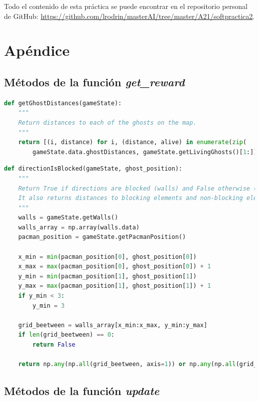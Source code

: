 \documentclass[11pt]{exam}
\begin{document}
Todo el contenido de esta práctica se puede encontrar en el repositorio personal de GitHub: \url{https://github.com/lrodrin/masterAI/tree/master/A21/softpractica2}.

\section{Apéndice}\label{apendice}

\subsection{Métodos de la función \textit{get\_reward}}\label{apendice_reward}

\begin{lstlisting}[caption={Función getGhostDistances.}, label={getGhostDistances}, language=python, basicstyle=\footnotesize]
def getGhostDistances(gameState):
	"""
	Return distances to each of the ghosts on the map.
	"""
	return [(i, distance) for i, (distance, alive) in enumerate(zip(
		gameState.data.ghostDistances, gameState.getLivingGhosts()[1:])) if alive]
\end{lstlisting}

\begin{lstlisting}[caption={Función directionIsBlocked.}, label={directionIsBlocked}, language=python, basicstyle=\footnotesize]
def directionIsBlocked(gameState, ghost_position):
	"""
	Return True if directions are blocked (walls) and False otherwise (no walls).
	It also returns distances to blocking elements and non-blocking elements.
	"""
	walls = gameState.getWalls()
	walls_array = np.array(walls.data)
	pacman_position = gameState.getPacmanPosition()
	
	x_min = min(pacman_position[0], ghost_position[0])
	x_max = max(pacman_position[0], ghost_position[0]) + 1
	y_min = min(pacman_position[1], ghost_position[1])
	y_max = max(pacman_position[1], ghost_position[1]) + 1
	if y_min < 3:
		y_min = 3
	
	grid_beetween = walls_array[x_min:x_max, y_min:y_max]
	if len(grid_beetween) == 0:
		return False
	
	return np.any(np.all(grid_beetween, axis=1)) or np.any(np.all(grid_beetween, axis=0))
\end{lstlisting}

\subsection{Métodos de la función \textit{update}}\label{apendice_update}
\end{document}
